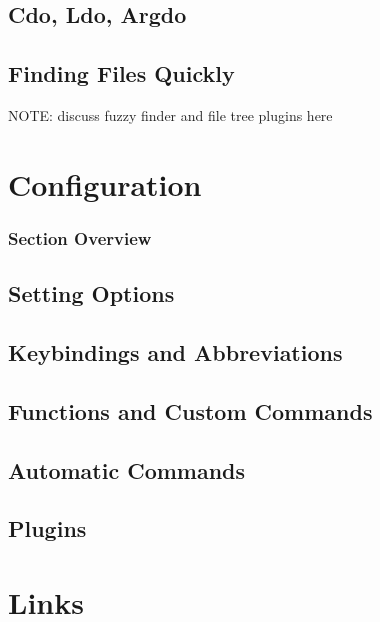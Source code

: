 \documentclass{beamer}
\begin{document}
\subsection{Cdo, Ldo, Argdo}
\begin{frame}
\end{frame}
\subsection{Finding Files Quickly}
\begin{frame}
		NOTE: discuss fuzzy finder and file tree plugins here
\end{frame}

\section{Configuration}
\begin{frame}
		\frametitle{Section Overview}
		\tableofcontents[sections=5]
\end{frame}
\subsection{Setting Options}
\begin{frame}
\end{frame}
\subsection{Keybindings and Abbreviations}
\begin{frame}
\end{frame}
\subsection{Functions and Custom Commands}
\begin{frame}
\end{frame}
\subsection{Automatic Commands}
\begin{frame}
\end{frame}
\subsection{Plugins}
\begin{frame}
\end{frame}

\section{Links}
\begin{frame}
\end{frame}
\end{document}

